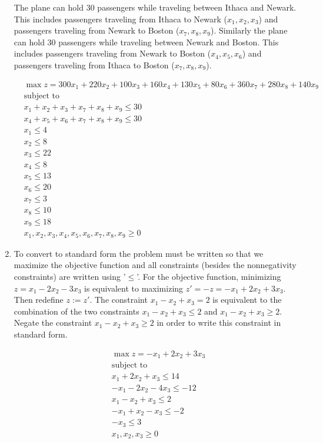 \documentclass{article}
\begin{document}
\begin{enumerate}
The plane can hold 30 passengers while traveling between Ithaca and Newark. This includes passengers traveling from Ithaca to Newark ($x_1,x_2,x_3$) and passengers traveling from Newark to Boston ($x_7,x_8,x_9$). Similarly the plane can hold 30 passengers while traveling between Newark and Boston. This includes passengers traveling from Newark to Boston ($x_4,x_5,x_6$) and passengers traveling from Ithaca to Boston ($x_7,x_8,x_9$). 

\begin{align*}
&\max z = 300x_1 + 220x_2 + 100x_3 + 160x_4 + 130x_5 + 80x_6 + 360x_7 + 280x_8 + 140x_9 \\
&\text{subject to} \\
&x_1 + x_2 + x_3 + x_7 + x_8 + x_9 \leq 30 \\
&x_4 + x_5 + x_6 + x_7 + x_8 + x_9 \leq 30 \\
&x_1 \leq 4 \\
&x_2 \leq 8 \\
&x_3 \leq 22 \\
&x_4 \leq 8 \\
&x_5 \leq 13 \\
&x_6 \leq 20 \\
&x_7 \leq 3 \\
&x_8 \leq 10 \\
&x_9 \leq 18 \\
&x_1,x_2,x_3,x_4,x_5,x_6,x_7,x_8,x_9 \geq 0
\end{align*}

\newpage
\item 

To convert to standard form the problem must be written so that we maximize the objective function and all constraints (besides the nonnegativity constraints) are written using '$\leq$'. For the objective function, minimizing $z = x_1 - 2x_2 -3x_3$ is equivalent to maximizing $z' = -z = -x_1 + 2x_2 +3x_3$. Then redefine $z:= z'$. The constraint $x_1 - x_2 + x_3 = 2$ is equivalent to the combination of the two constraints $x_1 -x_2 + x_3 \leq 2$ and $x_1 - x_2 + x_3 \geq 2$. Negate the constraint $x_1 - x_2 + x_3 \geq 2$ in order to write this constraint in standard form. 

\begin{align*}
&\max z = -x_1 + 2x_2 + 3x_3 \\
&\text{subject to}\\
&x_1 + 2x_2 + x_3 \leq 14 \\
&-x_1 - 2x_2 - 4x_3 \leq -12 \\
&x_1 - x_2 + x_3 \leq 2 \\
&-x_1 + x_2 - x_3 \leq -2 \\
&-x_3 \leq 3\\
&x_1, x_2, x_3 \geq 0
\end{align*}



\end{enumerate}
\end{document}
